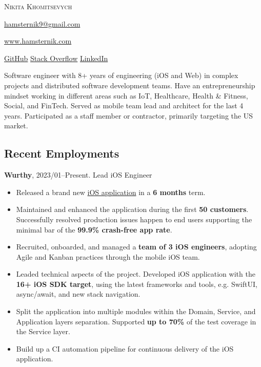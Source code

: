\documentclass{hamsternik.cv}
\begin{document}


\textsc{\huge{Nikita Khomitsevych}}

\vspace*{14px}

\href{mailto:hamsternik9@gmail.com}{hamsternik9@gmail.com} 

\href{https://www.hamsternik.com}{www.hamsternik.com}

\href{https://github.com/hamsternik}{\normalsize{GitHub}}
\hspace{2px}
\href{https://stackoverflow.com/users/3527499/hamsternik}{\normalsize{Stack Overflow}}
\hspace{2px}
\href{https://www.linkedin.com/in/khomitsevych/}{\normalsize{LinkedIn}} 

\vspace*{14px}

Software engineer with 8+ years of engineering (iOS and Web) in complex projects and distributed software development teams. 
Have an entrepreneurship mindset working in different areas such as IoT, Healthcare, Health \& Fitness, Social, and FinTech.
Served as mobile team lead and architect for the last 4 years.
Participated as a staff member or contractor, primarily targeting the US market.


\subsection*{Recent Employments}

\textbf{Wurthy}, 2023/01--Present.
Lead iOS Engineer

\begin{itemize}[label=-]
    \item Released a brand new {\href{https://apps.apple.com/us/app/wurthy/id6446956833}{iOS application}} in a \textbf{6 months} term.
    \item Maintained and enhanced the application during the first \textbf{50 customers}. Successfully resolved production issues happen to end users supporting the minimal bar of the \textbf{99.9\% crash-free app rate}.
    \item Recruited, onboarded, and managed a \textbf{team of 3 iOS engineers}, adopting Agile and Kanban practices through the mobile iOS team.
    \item Leaded technical aspects of the project. Developed iOS application with the \textbf{16+ iOS SDK target}, using the latest frameworks and tools, e.g. SwiftUI, async/await, and new stack navigation.
    \item Split the application into multiple modules within the Domain, Service, and Application layers separation. Supported \textbf{up to 70\%} of the test coverage in the Service layer.
    \item Build up a CI automation pipeline for continuous delivery of the iOS application.
\end{itemize}
\end{document}
